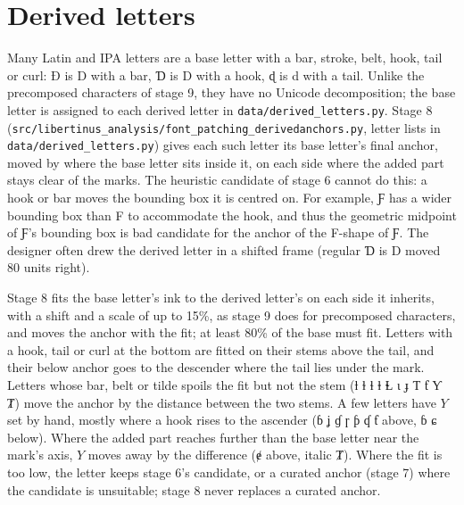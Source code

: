 \documentclass[landscape]{article}
\begin{document}


\newpage
\section*{Derived letters}

Many Latin and IPA letters are a base letter with a bar, stroke, belt, hook, tail or curl: Đ is D with a bar, Ɗ is D with a hook, ɖ is d with a tail.
Unlike the precomposed characters of stage 9, they have no Unicode decomposition; the base letter is assigned to each derived letter in \verb|data/derived_letters.py|.
Stage 8 (\verb|src/libertinus_analysis/font_patching_derivedanchors.py|, letter lists in \verb|data/derived_letters.py|) 
gives each such letter its base letter's final anchor, moved by where the base letter sits inside it, on each side where the added part stays clear of the marks.
The heuristic candidate of stage 6 cannot do this: a hook or bar moves the bounding box it is centred on. 
For example, Ƒ has a wider bounding box than F to accommodate the hook, 
and thus the geometric midpoint of Ƒ's bounding box is bad candidate for the anchor of the F-shape of Ƒ.
The designer often drew the derived letter in a shifted frame (regular Ɗ is D moved 80 units right).

Stage 8 fits the base letter's ink to the derived letter's on each side it inherits, with a shift and a scale of up to 15\%, as stage 9 does for precomposed characters, 
and moves the anchor with the fit; at least 80\% of the base must fit.
Letters with a hook, tail or curl at the bottom are fitted on their stems above the tail, and their below anchor goes to the descender where the tail lies under the mark.
Letters whose bar, belt or tilde spoils the fit but not the stem (ƚ ɫ ɬ ⱡ Ɫ ɩ ɟ Ƭ ƭ Ƴ Ⱦ) move the anchor by the distance between the two stems.
A few letters have $Y$ set by hand, mostly where a hook rises to the ascender (ɓ ʝ ɠ ɼ ƥ ʠ ƭ above, ɓ ɕ below).
Where the added part reaches further than the base letter near the mark's axis, $Y$ moves away by the difference (ɇ above, italic Ⱦ).
Where the fit is too low, the letter keeps stage 6's candidate, or a curated anchor (stage 7) where the candidate is unsuitable; stage 8 never replaces a curated anchor.
\end{document}
